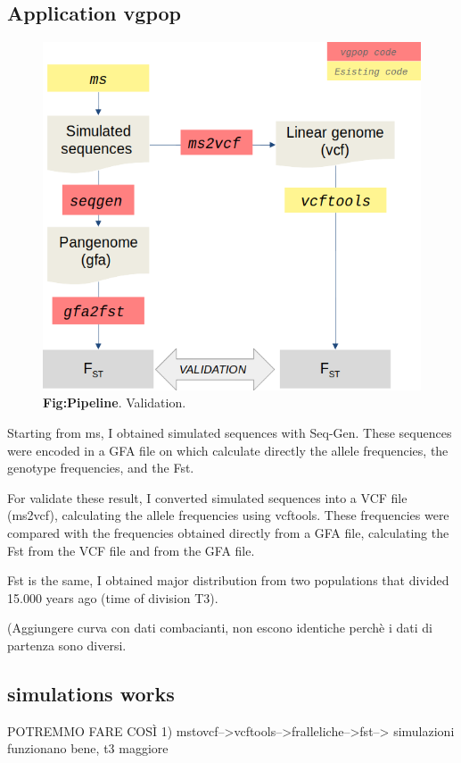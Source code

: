 \subsection{Application vgpop}
\begin{figure}[H]
\centering
\includegraphics[width=1.00\textwidth]{fig/pipeline.png}
\decoRule
\caption{\textbf{Fig:Pipeline}. 
Validation.}
\label{fig:population.pdf}
\end{figure}

Starting from ms, I obtained simulated sequences with Seq-Gen. These sequences were encoded in a GFA file on which calculate directly the allele frequencies, the genotype frequencies, and the Fst.

For validate these result, I converted simulated sequences into a VCF file (ms2vcf), calculating the allele frequencies using vcftools. These frequencies were compared with the frequencies obtained directly from a GFA file, calculating the Fst from the VCF file and from the GFA file.


Fst is the same, I obtained major distribution from two populations that divided 15.000 years ago (time of division T3). 

(Aggiungere curva con dati combacianti, non escono identiche perchè i dati di partenza sono diversi.




\subsection{simulations works}
POTREMMO FARE COSÌ
1) mstovcf-->vcftools-->fralleliche-->fst--> simulazioni funzionano bene, t3 maggiore

